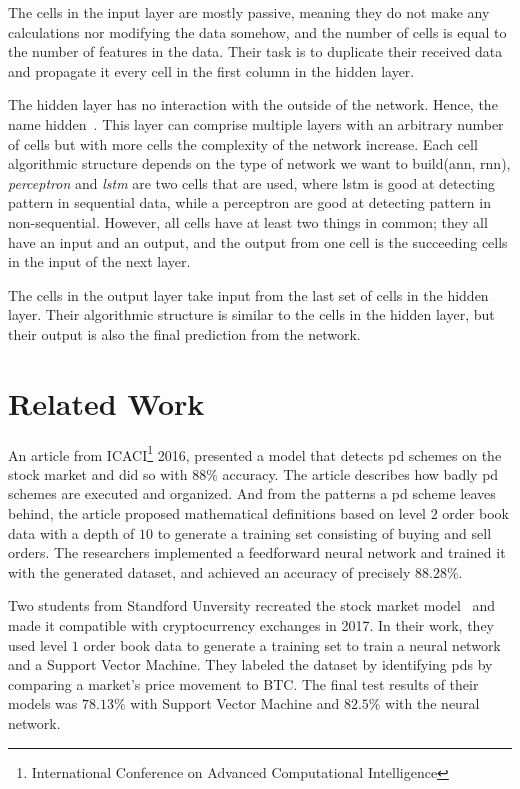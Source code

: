 The cells in the input layer are mostly passive, meaning they do not make any calculations nor modifying the data somehow, and the number of cells is equal to the number of features in the data. Their task is to duplicate their received data and propagate it every cell in the first column in the hidden layer.

The hidden layer has no interaction with the outside of the network. Hence, the name hidden~\cite{data_science, stanford}. This layer can comprise multiple layers with an arbitrary number of cells but with more cells the complexity of the network increase. Each cell algorithmic structure depends on the type of network we want to build(\ac{ann}, \ac{rnn}), \emph{perceptron} and \emph{lstm} are two cells that are used, where \ac{lstm} is good at detecting pattern in sequential data, while a perceptron are good at detecting pattern in non-sequential. However, all cells have at least two things in common; they all have an input and an output, and the output from one cell is the succeeding cells in the input of the next layer. 

The cells in the output layer take input from the last set of cells in the hidden layer. Their algorithmic structure is similar to the cells in the hidden layer, but their output is also the final prediction from the network.

\newpage
\section{Related Work}\label{sec:related_work}
An article from ICACI\footnote{International Conference on Advanced Computational Intelligence} 2016, \cite{P&D_stock_price_manipulation} presented a model that detects \ac{pd} schemes on the stock market and did so with $88\%$ accuracy. The article describes how badly \ac{pd} schemes are executed and organized. And from the patterns a \ac{pd} scheme leaves behind, the article proposed mathematical definitions based on level $2$ order book data with a depth of $10$ to generate a training set consisting of buying and sell orders. The researchers implemented a feedforward neural network and trained it with the generated dataset, and achieved an accuracy of precisely $88.28\%$.

Two students from Standford Unversity recreated the stock market model~\cite{P&D_stock_price_manipulation} and made it compatible with cryptocurrency exchanges in 2017. In their work, they used level $1$ order book data to generate a training set to train a neural network and a Support Vector Machine. They labeled the dataset by identifying \acp{pd} by comparing a market's price movement to BTC. The final test results of their models was $78.13\%$ with Support Vector Machine and $82.5$\% with the neural network. 

